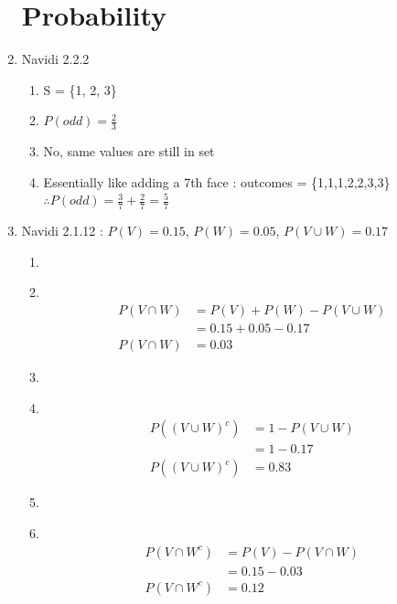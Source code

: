 \documentclass[11pt]{article}
\newcommand\Item[1][]{%
  \ifx\relax#1\relax  \item \else \item[#1] \fi
  \abovedisplayskip=0pt\abovedisplayshortskip=0pt~\vspace*{-\baselineskip}}
\begin{document}
\begin{enumerate}
              \section*{Probability}
        \item Navidi 2.2.2
              \begin{enumerate}
                      \item S = \{1, 2, 3\}
                      \item $P(odd) = \frac{2}{3}$
                      \item No, same values are still in set
                      \item Essentially like adding a 7th face : outcomes = \{1,1,1,2,2,3,3\}  \\
                            $\therefore P(odd) = \frac{3}{7} + \frac{2}{7} = \frac{5}{7}$
              \end{enumerate}
        \item Navidi 2.1.12 : $P(V) = 0.15$, $P(W) = 0.05$, $P(V \cup W) = 0.17$
              \begin{enumerate}
                      \Item
                      \begin{align*}
                              P(V \cap W) & = P(V) + P(W) - P(V \cup W) \\
                                          & = 0.15 + 0.05 - 0.17        \\
                              P(V \cap W) & = 0.03
                      \end{align*}
                      \Item
                      \begin{align*}
                              P((V \cup W)^{c}) & = 1 - P(V \cup W) \\
                                                & = 1 - 0.17        \\
                              P((V \cup W)^{c}) & = 0.83
                      \end{align*}
                      \Item
                      \begin{align*}
                              P(V \cap W^{c}) & = P(V) - P(V \cap W) \\
                                              & = 0.15 - 0.03        \\
                              P(V \cap W^{c}) & = 0.12
                      \end{align*}
              \end{enumerate}
\end{enumerate}
\end{document}
